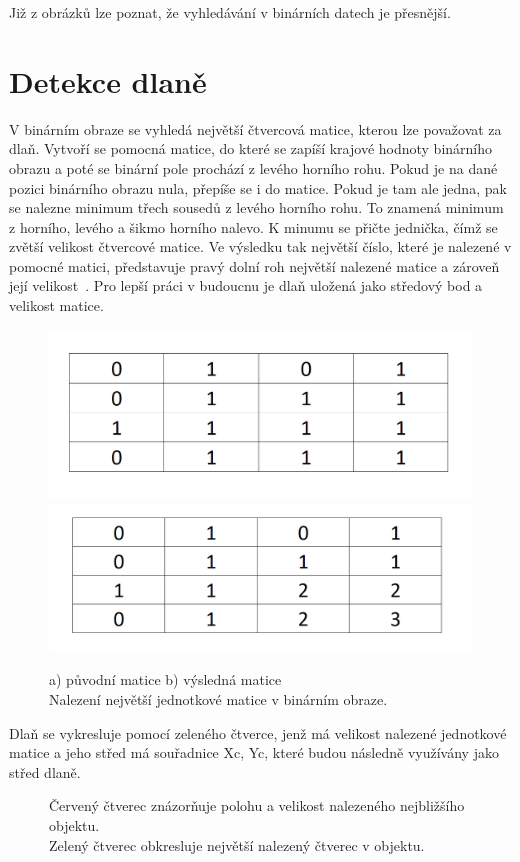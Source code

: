 Již z obrázků lze poznat, že vyhledávání v binárních datech je přesnější.
\newpage
\section{Detekce dlaně}
V binárním obraze se vyhledá největší čtvercová matice, kterou lze považovat za dlaň. Vytvoří se pomocná matice, do které se zapíší krajové hodnoty binárního obrazu a poté se binární pole prochází z levého horního rohu. Pokud je na dané pozici binárního obrazu nula, přepíše se i do matice. Pokud je tam ale jedna, pak se nalezne minimum třech sousedů z levého horního rohu. To znamená minimum z horního, levého a šikmo horního nalevo. K minumu se přičte jednička, čímž se zvětší velikost čtvercové matice. Ve výsledku tak největší číslo, které je nalezené v pomocné matici, představuje pravý dolní roh největší nalezené matice a zároveň její velikost~\cite{23}. Pro lepší práci v budoucnu je dlaň uložená jako středový bod a velikost matice.

\begin{figure} [htp]
\centering
\includegraphics[width=.45\textwidth]{before.png} \hfill
\includegraphics[width=.45\textwidth]{after.png} 
\centering
\caption{a) původní matice b) výsledná matice\\ Nalezení největší jednotkové matice v binárním obraze.}
\label{fig: palm}
\end{figure}

Dlaň se vykresluje pomocí zeleného čtverce, jenž má velikost nalezené jednotkové matice a jeho střed má souřadnice Xc, Yc, které budou následně využívány jako střed dlaně.

\begin{figure}[htp]
\centering
{}
\caption{Červený čtverec znázorňuje polohu a velikost nalezeného nejbližšího objektu.\\
Zelený čtverec obkresluje největší nalezený čtverec v objektu.}
\label{fig:square}
\end{figure}

